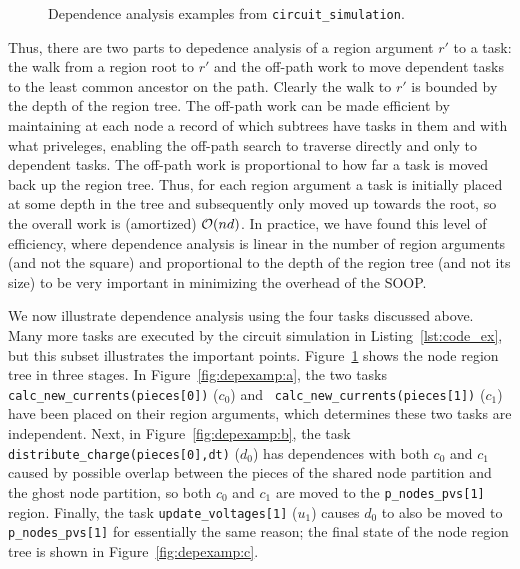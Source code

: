 \begin{figure}
\centering
{}
\label{fig:depexamp}
\caption{Dependence analysis examples from {\tt circuit\_simulation}.}
\end{figure}

Thus, there are two parts to depedence analysis of a region argument
$r'$ to a task: the walk from a region root to $r'$ and the off-path work
to move dependent tasks to the least common ancestor on the path.
Clearly the walk to $r'$ is bounded by the depth of the region tree.
The off-path work can be made efficient by maintaining at each node a
record of which subtrees have tasks in them and with what priveleges,
enabling the off-path search to traverse directly and only to
dependent tasks.  The off-path work is proportional to how far a task
is moved back up the region tree.  Thus, for each region argument a
task is initially placed at some depth in the tree and subsequently
only moved up towards the root, so the overall work is (amortized)
${\cal O}(nd)$.  In practice, we have found this level of efficiency,
where dependence analysis is linear in the number of region arguments (and not
the square) and proportional to the depth of the region tree (and not its size)
to be very important in minimizing the overhead of the SOOP.

We now illustrate dependence analysis using the four tasks discussed
above.  Many more tasks are executed by the circuit simulation in Listing~\ref{lst:code_ex},
but this subset illustrates the important
points. Figure~\ref{fig:depexamp} shows the node region tree in three
stages.  In Figure~\ref{fig:depexamp:a}, the two tasks
{\tt calc\_new\_currents(pieces[0])} ($c_0$) and {\tt
    calc\_new\_currents(pieces[1])} ($c_1$) have been placed on their region arguments,
  which determines these two tasks are independent.
Next, in Figure~\ref{fig:depexamp:b}, the task {\tt distribute\_charge(pieces[0],dt)} ($d_0$)
has dependences with both $c_0$ and $c_1$ caused by possible overlap between the pieces of the
shared node partition and the ghost node partition, so both $c_0$ and $c_1$ are moved to
the {\tt p\_nodes\_pvs[1]} region.  Finally, the task {\tt update\_voltages[1]} ($u_1$) causes
$d_0$ to also be moved to {\tt p\_nodes\_pvs[1]} for essentially the same reason; the final
state of the node region tree is shown in Figure~\ref{fig:depexamp:c}.


